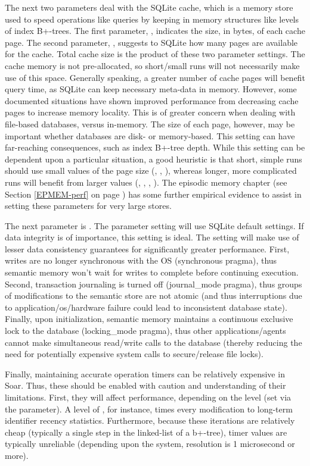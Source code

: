 The next two parameters deal with the SQLite cache, which is a memory store used to speed operations like queries by keeping in memory structures like levels of index B+-trees.
The first parameter, , indicates the size, in bytes, of each cache page.
The second parameter, , suggests to SQLite how many pages are available for the cache.
Total cache size is the product of these two parameter settings.
The cache memory is not pre-allocated, so short/small runs will not necessarily make use of this space.
Generally speaking, a greater number of cache pages will benefit query time, as SQLite can keep necessary meta-data in memory.
However, some documented situations have shown improved performance from decreasing cache pages to increase memory locality.
This is of greater concern when dealing with file-based databases, versus in-memory.
The size of each page, however, may be important whether databases are disk- or memory-based.
This setting can have far-reaching consequences, such as index B+-tree depth.
While this setting can be dependent upon a particular situation, a good heuristic is that short, simple runs should use small values of the page size (, , ), whereas longer, more complicated runs will benefit from larger values (, , , ).
The episodic memory chapter (see Section \ref{EPMEM-perf} on page \pageref{EPMEM-perf}) has some further empirical evidence to assist in setting these parameters for very large stores.

The next parameter is .
The  parameter setting will use SQLite default settings.
If data integrity is of importance, this setting is ideal.
The  setting will make use of lesser data consistency guarantees for significantly greater performance.
First, writes are no longer synchronous with the OS (synchronous pragma), thus semantic memory won't wait for writes to complete before continuing execution.
Second, transaction journaling is turned off (journal\_mode pragma), thus groups of modifications to the semantic store are not atomic (and thus interruptions due to application/os/hardware failure could lead to inconsistent database state).
Finally, upon initialization, semantic memory maintains a continuous exclusive lock to the database (locking\_mode pragma), thus other applications/agents cannot make simultaneous read/write calls to the database (thereby reducing the need for potentially expensive system calls to secure/release file locks).

Finally, maintaining accurate operation timers can be relatively expensive in Soar.
Thus, these should be enabled with caution and understanding of their limitations.
First, they will affect performance, depending on the level (set via the  parameter).
A level of , for instance, times every modification to long-term identifier recency statistics.
Furthermore, because these iterations are relatively cheap (typically a single step in the linked-list of a b+-tree), timer values are typically unreliable (depending upon the system, resolution is 1 microsecond or more).

